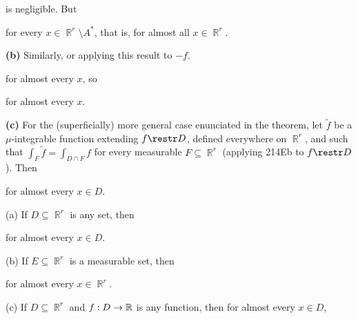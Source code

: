 { 
      
\noindent is negligible.   But 
      
      
\noindent for every $x\in\BbbR^r\setminus A^*$, that is, for almost 
all $x\in \BbbR^r$. 
      
\medskip 
      
{\bf (b)} Similarly, or applying this result to $-f$. 
      
      
\noindent for almost every $x$, so 
      
      
\noindent for almost every $x$. 
      
\medskip 
      
{\bf (c)} For the (superficially) more general case enunciated in the 
theorem, let $\tilde f$ be a $\mu$-integrable function extending 
$f\restr D$, defined everywhere on $\BbbR^r$, and such that 
$\int_F\tilde f=\int_{D\cap F}f$ for every measurable 
$F\subseteq\BbbR^r$ (applying 214Eb to $f\restr D$).   Then 
      
      
\noindent for almost every $x\in D$. 
}%
      
 (a) If $D\subseteq\BbbR^r$ is any set, then 
      
      
\noindent for almost every $x\in D$. 
      
(b) If $E\subseteq\BbbR^r$ is a measurable set, then 
      
      
\noindent for almost every $x\in \BbbR^r$. 
      
      
(c) If $D\subseteq\BbbR^r$ and $f:D\to\Bbb R$ is any function, then for 
almost every $x\in D$, 
      
